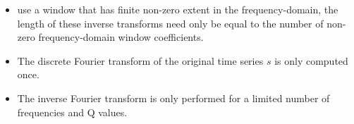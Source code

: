\begin{itemize}
\item use a window that has finite non-zero extent in the frequency-domain, the length of these inverse transforms need only be equal to the number of non-zero frequency-domain window coefficients.
\item The discrete Fourier transform of the original time series $s$ is only computed once.
  \item The inverse Fourier transform is only performed for a limited number of frequencies and Q values.
\end{itemize}
